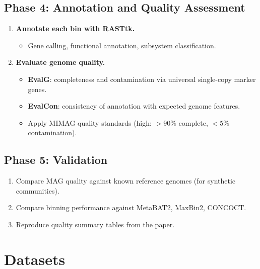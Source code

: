 \documentclass[11pt,a4paper]{article}
\begin{document}
\subsection{Phase 4: Annotation and Quality Assessment}
\begin{enumerate}[label=\textbf{4.\arabic*}]
  \item \textbf{Annotate each bin with RASTtk.}
    \begin{itemize}
      \item Gene calling, functional annotation, subsystem classification.
    \end{itemize}
  \item \textbf{Evaluate genome quality.}
    \begin{itemize}
      \item \textbf{EvalG}: completeness and contamination via universal single-copy marker genes.
      \item \textbf{EvalCon}: consistency of annotation with expected genome features.
      \item Apply MIMAG quality standards (high: $> 90\%$ complete, $< 5\%$ contamination).
    \end{itemize}
\end{enumerate}

\subsection{Phase 5: Validation}
\begin{enumerate}[label=\textbf{5.\arabic*}]
  \item Compare MAG quality against known reference genomes (for synthetic communities).
  \item Compare binning performance against MetaBAT2, MaxBin2, CONCOCT.
  \item Reproduce quality summary tables from the paper.
\end{enumerate}

\section{Datasets}
\end{document}
